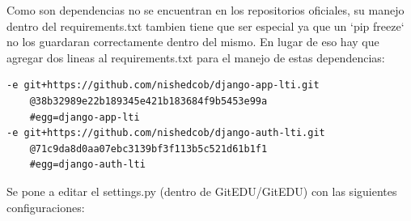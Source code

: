Como son dependencias no se encuentran en los repositorios oficiales, su manejo dentro del requirements.txt tambien tiene que ser especial ya que un `pip freeze` no los guardaran correctamente dentro del mismo. En lugar de eso hay que agregar dos lineas al requirements.txt para el manejo de estas dependencias:
\begin{lstlisting}
-e git+https://github.com/nishedcob/django-app-lti.git
    @38b32989e22b189345e421b183684f9b5453e99a
    #egg=django-app-lti
-e git+https://github.com/nishedcob/django-auth-lti.git
    @71c9da8d0aa07ebc3139bf3f113b5c521d61b1f1
    #egg=django-auth-lti
\end{lstlisting}


\lstset{language=Python}

Se pone a editar el settings.py (dentro de GitEDU/GitEDU) con las siguientes configuraciones:
